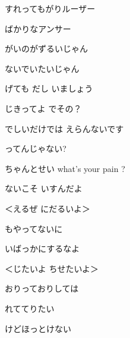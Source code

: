 \documentclass[a4paper,tate,twocolumn,12pt]{ltjtarticle}
\begin{document}
\begin{flushleft}
\begin{minipage}{\linewidth}
すれってもがりルーザー

ばかりなアンサー

がいのがずるいじゃん

ないでいたいじゃん

げても だし いましょう
\end{minipage}

\vspace{2em}

\noindent\begin{minipage}{\linewidth}
じきってよ でその？

でしいだけでは えらんないです

ってんじゃない?

ちゃんとせい what's your pain ?

ないこそ いすんだよ
\end{minipage}

\vspace{2em}

\noindent\begin{minipage}{\linewidth}
＜えるぜ にだるいよ＞

もやってないに

いばっかにするなよ

＜じたいよ ちせたいよ＞

おりっておりしては

れててりたい

けどほっとけない 
\end{minipage}

\end{flushleft}
\end{document}
